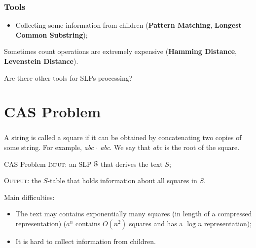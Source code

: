 \documentclass{beamer}
\begin{document}
\begin{frame}
\frametitle{Tools}

\begin{itemize}
  \item Collecting some information from children (\textbf{Pattern Matching}, \textbf{Longest Common Substring});
\end{itemize}

\pause 

\begin{center}
    \collectingTool
\end{center}

\pause

\begin{alertblock}{}
Sometimes count operations are extremely expensive (\textbf{Hamming Distance}, \textbf{Levenstein Distance}).
\end{alertblock}

\pause

\begin{block}{}
Are there other tools for SLPs processing?
\end{block}

\end{frame}

\section{CAS Problem}

\begin{frame}
\frametitle{}

\begin{definition}
A string is called a square if it can be obtained by concatenating two copies of some string.\newline
For example, \emph{abc} $\cdot$ \emph{abc}. We say that \emph{abc} is the root of the square.
\end{definition}

\pause

\begin{block}{CAS Problem}
\textsc{Input:} an SLP $\mathbb{S}$ that derives the text $S$;

\textsc{Output:} the $S$-table that holds information about all squares in $S$.
\end{block}

\pause

Main difficulties:
\begin{itemize}
  \item The text may contains exponentially many squares (in length of a compressed representation) 
  \newline ($a^n$ contains $O(n^2)$ squares and has a $\log n$ representation);
  \pause
  \item It is hard to collect information from children.
\end{itemize}

\end{frame}
\end{document}
